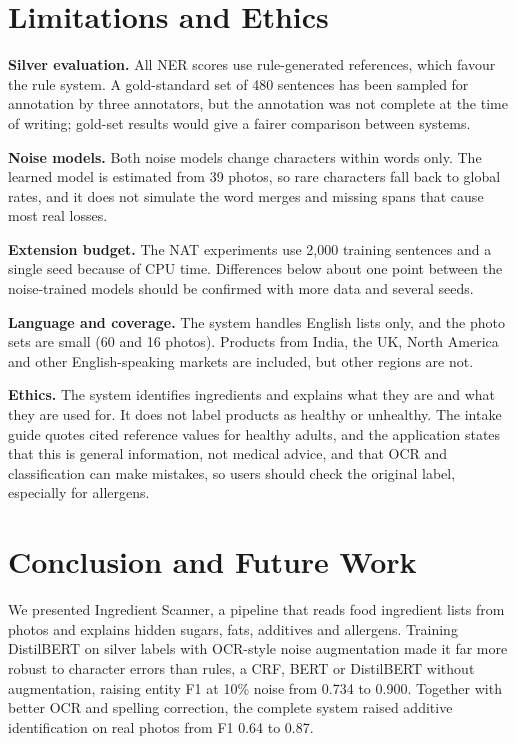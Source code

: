 \documentclass[conference]{IEEEtran}
\begin{document}
\section{Limitations and Ethics}

\textbf{Silver evaluation.} All NER scores use rule-generated references, which favour the rule system. A gold-standard set of 480 sentences has been sampled for annotation by three annotators, but the annotation was not complete at the time of writing; gold-set results would give a fairer comparison between systems.

\textbf{Noise models.} Both noise models change characters within words only. The learned model is estimated from 39 photos, so rare characters fall back to global rates, and it does not simulate the word merges and missing spans that cause most real losses.

\textbf{Extension budget.} The NAT experiments use 2,000 training sentences and a single seed because of CPU time. Differences below about one point between the noise-trained models should be confirmed with more data and several seeds.

\textbf{Language and coverage.} The system handles English lists only, and the photo sets are small (60 and 16 photos). Products from India, the UK, North America and other English-speaking markets are included, but other regions are not.

\textbf{Ethics.} The system identifies ingredients and explains what they are and what they are used for. It does not label products as healthy or unhealthy. The intake guide quotes cited reference values for healthy adults, and the application states that this is general information, not medical advice, and that OCR and classification can make mistakes, so users should check the original label, especially for allergens.

\section{Conclusion and Future Work}

We presented Ingredient Scanner, a pipeline that reads food ingredient lists from photos and explains hidden sugars, fats, additives and allergens. Training DistilBERT on silver labels with OCR-style noise augmentation made it far more robust to character errors than rules, a CRF, BERT or DistilBERT without augmentation, raising entity F1 at 10\% noise from 0.734 to 0.900. Together with better OCR and spelling correction, the complete system raised additive identification on real photos from F1 0.64 to 0.87.
\end{document}
